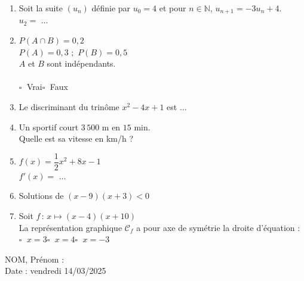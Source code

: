 \documentclass[a4paper,11pt,landscape,exos]{nsi} %
\begin{document}
\begin{multicols}{2}
\begin{enumerate}[itemsep=1em]
\begin{tikzpicture}[baseline,scale = 0.6]
\end{tikzpicture}\\
	\item Soit la suite $(u_n)$ définie  par $u_0 = 4$ et pour $n \in \mathbb{N}$, 
    $u_{n+1} = -3u_n +4$.\\
    $u_2=$ $\ldots$
	\item $P(A\cap B)=0{,}2$\\$P(A)=0{,}3\,\,;\,\,P(B)=0{,}5$\\$A$ et $B$ sont indépendants.\\\\	$\square\;$ Vrai\qquad $\square\;$ Faux\qquad 
	\item Le discriminant du trinôme $x^2-4x+1$ est  $\ldots$
	\item Un sportif court $3\,500$ m  en $15$ min.\\
      Quelle est sa vitesse en km/h ?
	\item $f(x)=\dfrac{1}{2}x^2+8x-1$\\
    $f'(x)=$ $\ldots$
	
	\item Solutions de $(x-9)(x+3)  < 0$\\
	\item Soit $f\,:\,x\longmapsto (x-4)(x+10) $\\
    La représentation graphique $\mathcal{C}_f$ a pour axe de symétrie la droite d’équation :\\	$\square\;$ $x=3$\qquad $\square\;$ $x=4$\qquad $\square\;$ $x=-3$\qquad  
	
\end{enumerate}
\vfill\null
\columnbreak

\textcolor{UGLiBlue}{NOM, Prénom :\\
Date : vendredi 14/03/2025}

\end{multicols}

\newpage
\end{document}
